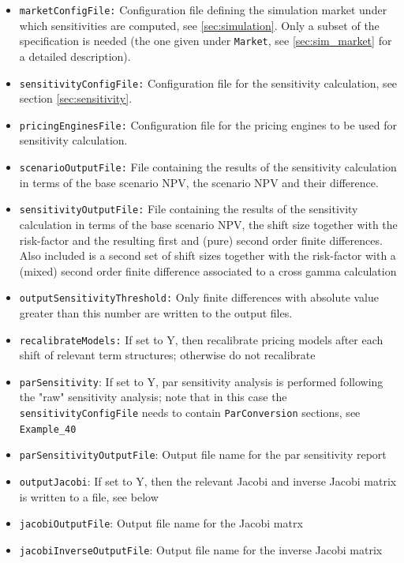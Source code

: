 \documentclass[12pt, a4paper]{article}
\begin{document}
\begin{itemize}
\item {\tt marketConfigFile:} Configuration file defining the simulation market under which sensitivities are computed,
  see \ref{sec:simulation}. Only a subset of the specification is needed (the one given under {\tt Market}, see
  \ref{sec:sim_market} for a detailed description).
\item {\tt sensitivityConfigFile:} Configuration file  for the sensitivity calculation, see section \ref{sec:sensitivity}.
\item {\tt pricingEnginesFile:} Configuration file for the pricing engines to be used for sensitivity calculation.
\item {\tt scenarioOutputFile:} File containing the results of the sensitivity calculation in terms of the base scenario
  NPV, the scenario NPV and their difference.
\item {\tt sensitivityOutputFile:} File containing the results of the sensitivity calculation in terms of the base scenario
  NPV, the shift size together with the risk-factor and the resulting first and (pure) second order finite differences.
  Also included is a second set of shift sizes together with the risk-factor with a (mixed) second order finite difference associated to a cross gamma calculation
\item {\tt outputSensitivityThreshold:} Only finite differences with absolute value greater than this number are written
  to the output files.
\item {\tt recalibrateModels:} If set to Y, then recalibrate pricing models after each shift of relevant term structures; otherwise do not recalibrate
\item {\tt parSensitivity}: If set to Y, par sensitivity analysis is performed following the "raw" sensitivity analysis; note that in this case the 
{\tt sensitivityConfigFile} needs to contain {\tt ParConversion} sections, see {\tt Example\_40}   
\item {\tt parSensitivityOutputFile}: Output file name for the par sensitivity report
\item {\tt outputJacobi}: If set to Y, then the relevant Jacobi and inverse Jacobi matrix is written to a file, see below
\item {\tt jacobiOutputFile}: Output file name for the Jacobi matrx
\item {\tt jacobiInverseOutputFile}: Output file name for the inverse Jacobi matrix
\end{itemize}
\end{document}
